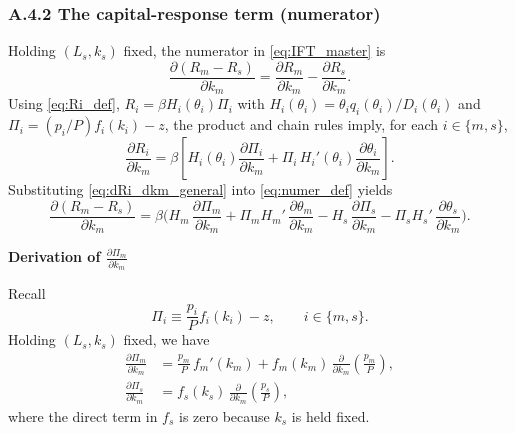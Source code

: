 \documentclass[12pt]{article} %
\theoremstyle{remark}
\begin{document}
\vspace{0.3cm}


\subsubsection*{A.4.2 The capital-response term (numerator)}
Holding $(L_s,k_s)$ fixed, the numerator in \eqref{eq:IFT_master} is
\begin{equation}\label{eq:numer_def}
\frac{\partial (R_m-R_s)}{\partial k_m}
=\frac{\partial R_m}{\partial k_m}-\frac{\partial R_s}{\partial k_m}.
\end{equation}
Using \eqref{eq:Ri_def}, $R_i=\beta H_i(\theta_i)\Pi_i$ with
$H_i(\theta_i)=\theta_i q_i(\theta_i)/D_i(\theta_i)$ and
$\Pi_i=(p_i/P)f_i(k_i)-z$, the product and chain rules imply, for each
$i\in\{m,s\}$,
\begin{equation}\label{eq:dRi_dkm_general}
\frac{\partial R_i}{\partial k_m}
=\beta\left[
H_i(\theta_i)\frac{\partial \Pi_i}{\partial k_m}
+\Pi_i\,H_i'(\theta_i)\frac{\partial \theta_i}{\partial k_m}
\right].
\end{equation}
Substituting \eqref{eq:dRi_dkm_general} into \eqref{eq:numer_def} yields
\begin{equation}\label{eq:numer_expanded}
\frac{\partial (R_m-R_s)}{\partial k_m}
=\beta\Bigg(
H_m\,\frac{\partial \Pi_m}{\partial k_m}
+\Pi_m H_m'\,\frac{\partial \theta_m}{\partial k_m}
-
H_s\,\frac{\partial \Pi_s}{\partial k_m}
-\Pi_s H_s'\,\frac{\partial \theta_s}{\partial k_m}
\Bigg).
\end{equation}

\textbf{Derivation of $\frac{\partial \Pi_m}{\partial k_m}$}

Recall
\[
\Pi_i \equiv \frac{p_i}{P}f_i(k_i)-z,\qquad i\in\{m,s\}.
\]
Holding $(L_s,k_s)$ fixed, we have
\begin{align}
\frac{\partial \Pi_m}{\partial k_m}
&=
\frac{p_m}{P}\,f_m'(k_m)
+f_m(k_m)\,\frac{\partial}{\partial k_m}\!\left(\frac{p_m}{P}\right),
\label{eq:dPim_dkm}\\[0.4em]
\frac{\partial \Pi_s}{\partial k_m}
&=
f_s(k_s)\,\frac{\partial}{\partial k_m}\!\left(\frac{p_s}{P}\right),
\label{eq:dPis_dkm}
\end{align}
where the direct term in $f_s$ is zero because $k_s$ is held fixed.
\end{document}
